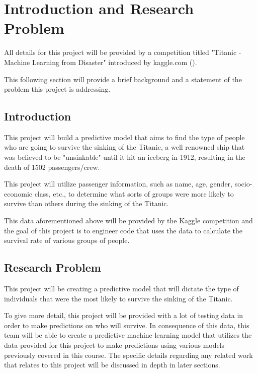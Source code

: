 \documentclass{APA}[12pt]
\begin{document}
\tableofcontents

\newpage

\section{Introduction and Research Problem}
All details for this project will be provided by a competition titled "Titanic - Machine Learning from Disaster" introduced by kaggle.com (\cite{titanic}).

This following section will provide a brief background and a statement of the problem this project is addressing.




\subsection{Introduction}

This project will build a predictive model that aims to find the type of people who are going to survive the sinking of the Titanic, a well renowned ship that was believed to be "unsinkable" until it hit an iceberg in 1912, resulting in the death of 1502 passengers/crew.

This project will utilize passenger information, such as name, age, gender, socio-economic class, etc., to determine what sorts of groups were more likely to survive than others during the sinking of the Titanic.

This data aforementioned above will be provided by the Kaggle competition and the goal of this project is to engineer code that uses the data to calculate the survival rate of various groups of people.

\subsection{Research Problem}

This project will be creating a predictive model that will dictate the type of individuals that were the most likely to survive the sinking of the Titanic.

To give more detail, this project will be provided with a lot of testing data in order to make predictions on who will survive. In consequence of this data, this team will be able to create a predictive machine learning model that utilizes the data provided for this project to make predictions using various models previously covered in this course. The specific details regarding any related work that relates to this project will be discussed in depth in later sections.
\end{document}
